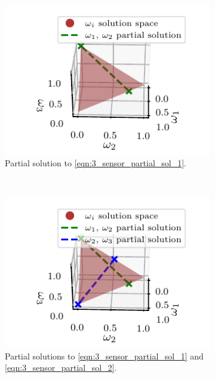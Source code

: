 \documentclass[letterpaper, 10 pt, conference]{ieeeconf}  %
\begin{document}
\begin{figure}[tb]
   \begin{subfigure}[t]{0.3\textwidth}
      \vspace{-5pt}
      \begin{center}
         \includegraphics{images/partial_sol1.pdf}
      \end{center}
      \vspace{-10pt}
      \caption{Partial solution to \eqref{eqn:3_sensor_partial_sol_1}.}
      \label{fig:3_sensor_partial_sol}
   \end{subfigure}
   ~
   \begin{subfigure}[t]{0.3\textwidth}
      \vspace{-5pt}
      \begin{center}
         \includegraphics{images/partial_sols.pdf}
      \end{center}
      \vspace{-10pt}
      \caption{Partial solutions to \eqref{eqn:3_sensor_partial_sol_1} and \eqref{eqn:3_sensor_partial_sol_2}.}
      \label{fig:3_sensor_partial_sols}
   \end{subfigure}
   ~
   \begin{subfigure}[t]{0.3\textwidth}
      \vspace{-5pt}

\end{subfigure}
\end{figure}
\end{document}
